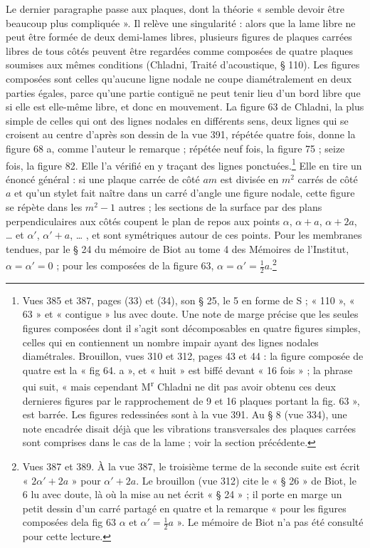 \documentclass[11pt,a4paper]{article}
\begin{document}
Le dernier paragraphe passe aux plaques, dont la théorie « semble devoir être beaucoup plus compliquée ». Il relève une singularité : alors que la lame libre ne peut être formée de deux demi-lames libres, plusieurs figures de plaques carrées libres de tous côtés peuvent être regardées comme composées de quatre plaques soumises aux mêmes conditions (Chladni, Traité d'acoustique, § 110). Les figures composées sont celles qu'aucune ligne nodale ne coupe diamétralement en deux parties égales, parce qu'une partie contiguë ne peut tenir lieu d'un bord libre que si elle est elle-même libre, et donc en mouvement. La figure 63 de Chladni, la plus simple de celles qui ont des lignes nodales en différents sens, deux lignes qui se croisent au centre d'après son dessin de la vue 391, répétée quatre fois, donne la figure 68 a, comme l'auteur le remarque ; répétée neuf fois, la figure 75 ; seize fois, la figure 82. Elle l'a vérifié en y traçant des lignes ponctuées.\footnote{Vues 385 et 387, pages (33) et (34), son § 25, le 5 en forme de S ; « 110 », « 63 » et « contigue » lus avec doute. Une note de marge précise que les seules figures composées dont il s'agit sont décomposables en quatre figures simples, celles qui en contiennent un nombre impair ayant des lignes nodales diamétrales. Brouillon, vues 310 et 312, pages 43 et 44 : la figure composée de quatre est la « fig 64. a », et « huit » est biffé devant « 16 fois » ; la phrase qui suit, « mais cependant M\textsuperscript{r} Chladni ne dit pas avoir obtenu ces deux dernieres figures par le rapprochement de 9 et 16 plaques portant la fig. 63 », est barrée. Les figures redessinées sont à la vue 391. Au § 8 (vue 334), une note encadrée disait déjà que les vibrations transversales des plaques carrées sont comprises dans le cas de la lame ; voir la section précédente.} Elle en tire un énoncé général : si une plaque carrée de côté $am$ est divisée en $m^2$ carrés de côté $a$ et qu'un stylet fait naître dans un carré d'angle une figure nodale, cette figure se répète dans les $m^2-1$ autres ; les sections de la surface par des plans perpendiculaires aux côtés coupent le plan de repos aux points $\alpha$, $\alpha+a$, $\alpha+2a$, … et $\alpha'$, $\alpha'+a$, … , et sont symétriques autour de ces points. Pour les membranes tendues, par le § 24 du mémoire de Biot au tome 4 des Mémoires de l'Institut, $\alpha=\alpha'=0$ ; pour les composées de la figure 63, $\alpha=\alpha'=\frac12a$.\footnote{Vues 387 et 389. À la vue 387, le troisième terme de la seconde suite est écrit « $2\alpha'+2a$ » pour $\alpha'+2a$. Le brouillon (vue 312) cite le « § 26 » de Biot, le 6 lu avec doute, là où la mise au net écrit « § 24 » ; il porte en marge un petit dessin d'un carré partagé en quatre et la remarque « pour les figures composées dela fig 63 $\alpha$ et $\alpha'=\frac12a$ ». Le mémoire de Biot n'a pas été consulté pour cette lecture.}
\end{document}
